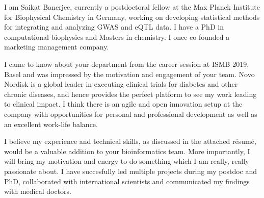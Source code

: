 \documentclass[11pt, a4paper]{awesome-cv} %
\begin{document}
\makecvheader %

\makelettertitle %


\begin{cvletter}



I am Saikat Banerjee, currently a postdoctoral fellow at the Max Planck Institute for Biophysical Chemistry in Germany,
working on developing statistical methods for integrating and analyzing GWAS and eQTL data.
I have a PhD in computational biophysics and Masters in chemistry. 
I once co-founded a marketing management company.



I came to know about your department from the career session at ISMB 2019, Basel and was impressed by the motivation and engagement of your team.
Novo Nordisk is a global leader in executing clinical trials for diabetes and other chronic diseases,
and hence provides the perfect platform to see my work leading to clinical impact.
I think there is an agile and open innovation setup at the company with opportunities for personal and professional development as well as an excellent work-life balance.



I believe my experience and technical skills, as discussed in the attached r{\'e}sum{\'e}, would be a valuable addition to your bioinformatics team. 
More importantly, I will bring my motivation and energy to do something which I am really, really passionate about.
I have succesfully led multiple projects during my postdoc and PhD, collaborated with international scientists 
and communicated my findings with medical doctors.


\end{cvletter}


\makeletterclosing %
\end{document}
